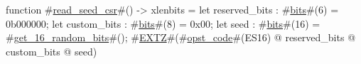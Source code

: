 function #\hyperref[sailRISCVzreadzyseedzycsr]{read\_seed\_csr}#() -> xlenbits = {
  let reserved_bits : #\hyperref[sailRISCVzbits]{bits}#(6) = 0b000000;
  let custom_bits : #\hyperref[sailRISCVzbits]{bits}#(8) = 0x00;
  let seed : #\hyperref[sailRISCVzbits]{bits}#(16) = #\hyperref[sailRISCVzgetzy16zyrandomzybits]{get\_16\_random\_bits}#();
  #\hyperref[sailRISCVzEXTZ]{EXTZ}#(#\hyperref[sailRISCVzopstzycode]{opst\_code}#(ES16) @ reserved_bits @ custom_bits @ seed)
}
